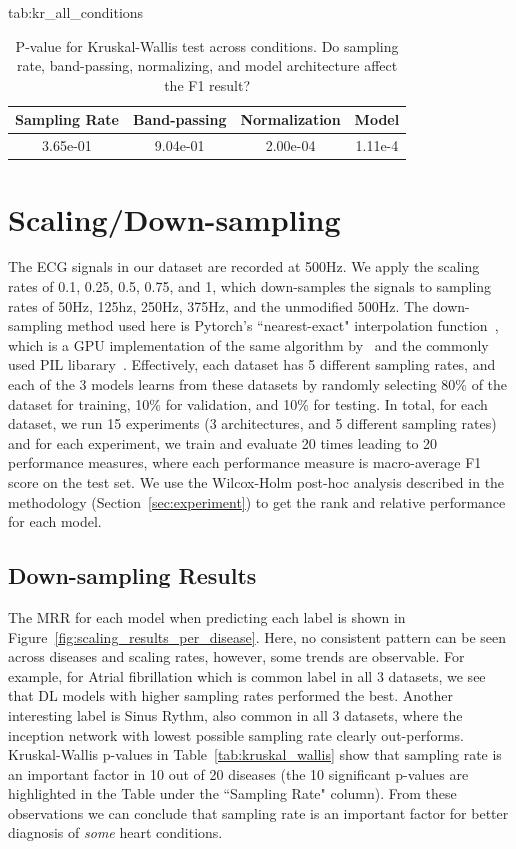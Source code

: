 \documentclass[pmlr,twocolumn]{jmlr}%
\begin{document}
\begin{table}[htbp]
\floatconts
  {tab:kr_all_conditions}
  {\caption{P-value for Kruskal-Wallis test across conditions. Do sampling rate, band-passing, normalizing, and model architecture affect the F1 result?}}
  {\begin{tabular}{|c|c|c|c|}
  \hline
    \bfseries Sampling Rate & \bfseries Band-passing & \bfseries Normalization & \bfseries Model \\
  \hline
  3.65e-01 & 9.04e-01 & 2.00e-04 & 1.11e-4  \\
  \hline
  \end{tabular}}
\end{table}



\section{Scaling/Down-sampling}
\label{sec:scaling}
The ECG signals in our dataset are recorded at 500Hz. We apply the  scaling rates of 0.1, 0.25, 0.5, 0.75, and 1, which down-samples the signals to sampling rates of 50Hz, 125hz, 250Hz, 375Hz, and the unmodified 500Hz. The down-sampling method used here is Pytorch's ``nearest-exact" interpolation function~\cite{NEURIPS2019_9015}, which is a GPU implementation of the same algorithm by~\cite{van2014scikit} and the commonly used PIL libarary~\cite{clark2015pillow}. Effectively, each dataset has 5 different sampling rates, and each of the 3 models learns from these datasets by randomly selecting 80\% of the dataset for training, 10\% for validation, and 10\% for testing. In total, for each dataset, we run 15 experiments (3 architectures, and 5 different sampling rates) and for each experiment, we train and evaluate 20 times leading to 20 performance measures, where each performance measure is macro-average F1 score on the test set. We use the Wilcox-Holm post-hoc analysis described in the methodology (Section~\ref{sec:experiment}) to get the rank and relative performance for each model. 
\subsection{Down-sampling Results}
\label{sec_ds_results}
The MRR for each model when predicting each label is shown in Figure~\ref{fig:scaling_results_per_disease}. Here, no consistent pattern can be seen across diseases and scaling rates, however, some trends are observable. For example, for Atrial fibrillation which is common label in all 3 datasets, we see that DL models with higher sampling rates performed the best. Another interesting label is Sinus Rythm, also common in all 3 datasets,  where the inception network with lowest possible sampling rate clearly out-performs. Kruskal-Wallis p-values in Table~\ref{tab:kruskal_wallis} show that sampling rate is an important factor in 10 out of 20 diseases (the 10 significant p-values are highlighted in the Table under the ``Sampling Rate" column). From these observations we can conclude that sampling rate is an important factor for better diagnosis of \textit{some} heart conditions. 
\end{document}
